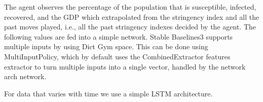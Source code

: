 \documentclass[tikz,fleqn,12pt]{wlscirep}
\begin{document}
The agent observes the percentage of the population that is susceptible, infected, recovered, and the GDP which extrapolated from the stringency index and all the past moves played, i.e., all the past stringency indexes decided by the agent. The following values are fed into a simple network. Stable Baselines3 supports multiple inputs by using Dict Gym space. This can be done using MultiInputPolicy, which by default uses the CombinedExtractor features extractor to turn multiple inputs into a single vector, handled by the network arch network.

For data that varies with time we use a simple LSTM architecture.

\end{document}
